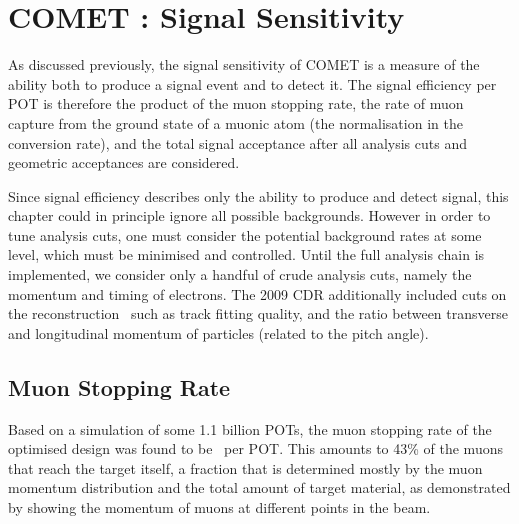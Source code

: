 
\chapter{COMET \phaseII: Signal Sensitivity}
As discussed previously, the signal sensitivity of COMET is a measure of the ability both to produce a signal event
and to detect it.
The signal efficiency per \ac{POT} is therefore the product of the muon stopping rate, the rate of muon capture from the ground state of a muonic atom (the normalisation in the conversion rate), and the total signal acceptance after all analysis cuts and geometric acceptances are considered.

Since signal efficiency describes only the ability to produce and detect signal, this chapter could in principle ignore all possible backgrounds.
However in order to tune analysis cuts, one must consider the potential background rates at some level, which must be minimised and controlled.
Until the full analysis chain is implemented, we consider only a handful of crude analysis cuts, namely the momentum and timing of electrons.
The 2009 \ac{CDR} additionally included cuts on the reconstruction~\cite{CDRphase2} such as track fitting quality, and the ratio between transverse and longitudinal momentum of particles (related to the pitch angle).

\FigSensMuMomentum
\section{Muon Stopping Rate}
Based on a simulation of some 1.1 billion \acp{POT}, the muon stopping rate of the optimised design was found to be ~per \ac{POT}.
This amounts to 43\% of the muons that reach the target itself, a fraction that is determined mostly by the muon momentum distribution and the total amount of target material, as demonstrated by 
showing the momentum of muons at different points in the beam.

